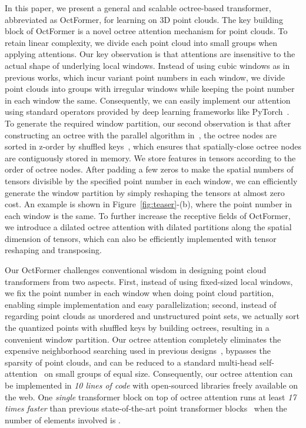 \documentclass[acmtog,screen,authorversion]{acmart}
\begin{document}
In this paper, we present a general and scalable octree-based transformer, abbreviated as OctFormer, for learning on 3D point clouds.
The key building block of OctFormer is a novel octree attention mechanism for point clouds.
To retain linear complexity, we divide each point cloud into small groups when applying attentions.
Our key observation is that attentions are insensitive to the actual shape of underlying local windows.
Instead of using cubic windows as in previous works, which incur variant point numbers in each window, we divide point clouds into groups with irregular windows while keeping the point number in each window the same.
Consequently, we can easily implement our attention using standard operators provided by deep learning frameworks like PyTorch~\cite{Paszke2019}.
To generate the required window partition, our second observation is that after constructing an octree with the parallel algorithm in~\cite{Zhou2011}, the octree nodes are sorted in z-order by shuffled keys~\cite{Wilhelms1992}, which ensures that spatially-close octree nodes are contiguously stored in memory.
We store features in tensors according to the order of octree nodes.
After padding a few zeros to make the spatial numbers of tensors divisible by the specified point number in each window, we can efficiently generate the window partition by simply reshaping the tensors at almost zero cost.
An example is shown in Figure~\ref{fig:teaser}-(b), where the point number in each window is the same.
To further increase the receptive fields of OctFormer, we introduce a dilated octree attention with dilated partitions along the spatial dimension of tensors, which can also be efficiently implemented with tensor reshaping and transposing.


Our OctFormer challenges conventional wisdom in designing point cloud transformers from two aspects. 
First, instead of using fixed-sized local windows, we fix the point number in each window when doing point cloud partition, enabling simple implementation and easy parallelization; 
second, instead of regarding point clouds as unordered and unstructured point sets, we actually sort the quantized points with shuffled keys by building octrees, resulting in a convenient window partition.
Our octree attention completely eliminates the expensive neighborhood searching used in previous designs~\cite{Wu2022,Lai2022}, bypasses the sparsity of point clouds, and can be reduced to a standard multi-head self-attention~\cite{Vaswani2017} on small groups of equal size. 
Consequently, our octree attention can be implemented in \emph{10 lines of code} with open-sourced libraries freely available on the web. 
One \emph{single} transformer block on top of octree attention runs at least \emph{17 times faster} than previous state-of-the-art point transformer blocks~\cite{Lai2022,Wu2022} when the number of elements involved is .
\end{document}
